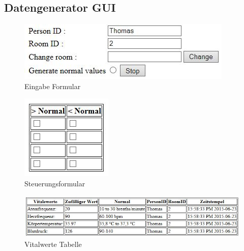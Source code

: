 \subsection{Datengenerator GUI}
\begin{figure}[H]
	\begin{center}
		\includegraphics[scale=0.9]{images/eingabe-formular.jpg}
		\caption{Eingabe Formular}
	\end{center}
\end{figure}
\begin{figure}[H]
	\begin{center}
		\includegraphics[scale=0.9]{images/kritische-werte-tabelle.jpg}
		\caption{Steuerungsformular}
	\end{center}
\end{figure}
\begin{figure}[H]
	\begin{center}
		\includegraphics[scale=0.9]{images/vitalwerte-tabelle.jpg}
		\caption{Vitalwerte Tabelle}
	\end{center}
\end{figure}